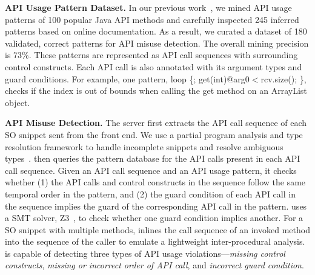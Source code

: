 {\bf API Usage Pattern Dataset.} In our previous work~\cite{zhang2018code}, we mined API usage patterns of 100 popular Java API methods and carefully inspected 245 inferred patterns based on online documentation. As a result, we curated a dataset of 180 validated, correct patterns for API misuse detection. The overall mining precision is 73\%. These patterns are represented as API call sequences with surrounding control constructs. Each API call is also annotated with its argument types and guard conditions. For example, one pattern, {\ttt loop \{; get(int)@arg0$<$rcv.size(); \}}, checks if the index is out of bounds when calling the {\ttt get} method on an {\ttt ArrayList} object. %

{\bf API Misuse Detection.} The server first extracts the API call sequence of each SO snippet sent from the front end. We use a partial program analysis and type resolution framework to handle incomplete snippets and resolve ambiguous types~\cite{subramanian2014live}. {\tool} then queries the pattern database for the API calls present in each API call sequence. Given an API call sequence and an API usage pattern, it checks whether (1) the API calls and control constructs in the sequence follow the same temporal order in the pattern, and (2) the guard condition of each API call in the sequence implies the guard of the corresponding API call in the pattern. {\tool} uses a SMT solver, Z3~\cite{de2008z3}, to check whether one guard condition implies another. For a SO snippet with multiple methods, {\tool} inlines the call sequence of an invoked method into the sequence of the caller to emulate a lightweight inter-procedural analysis. {\tool} is capable of detecting three types of API usage violations---{\em missing control constructs}, {\em missing or incorrect order of API call}, and {\em incorrect guard condition}.


